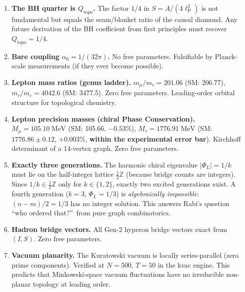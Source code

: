 \documentclass[11pt]{article}
\newcommand{\lP}{\ell_{\mathrm{P}}}
\begin{document}
\begin{enumerate}
\item \textbf{The BH quarter is $Q_{\mathrm{topo}}$.}
  The factor $1/4$ in $S = A/(4\lP^2)$ is not fundamental
  but equals the seam/blanket ratio of the causal diamond.
  Any future derivation of the BH coefficient from first
  principles must recover $Q_{\mathrm{topo}} = 1/4$.

\item \textbf{Bare coupling $\alpha_0 = 1/(32\pi)$.}
  No free parameters.  Falsifiable by Planck-scale
  measurements (if they ever become possible).

\item \textbf{Lepton mass ratios (genus ladder).}
  $m_\mu/m_e = 201.06$ (SM: 206.77),
  $m_\tau/m_e = 4042.6$ (SM: 3477.5).
  Zero free parameters.  Leading-order orbital structure
  for topological chemistry.

\item \textbf{Lepton precision masses (chiral Phase Conservation).}
  $M_\mu = 105.10\;\mathrm{MeV}$ (SM: 105.66, $-0.53\%$),
  $M_\tau = 1776.91\;\mathrm{MeV}$ (SM: $1776.86 \pm 0.12$,
  $+0.003\%$, \textbf{within the experimental error bar}).
  Kirchhoff determinant of a 14-vertex graph.
  Zero free parameters.

\item \textbf{Exactly three generations.}
  The harmonic chiral eigenvalue $|\Phi_L| = 1/k$ must lie
  on the half-integer lattice $\tfrac{1}{2}\mathbb{Z}$
  (because bridge counts are integers).  Since
  $1/k \in \tfrac{1}{2}\mathbb{Z}$ only for $k \in \{1,2\}$,
  exactly two excited generations exist.  A fourth generation
  ($k = 3$, $\Phi_L = 1/3$) is \emph{algebraically impossible}:
  $(n - m)/2 = 1/3$ has no integer solution.  This answers
  Rabi's question ``who ordered that?''\ from pure graph
  combinatorics.

\item \textbf{Hadron bridge vectors.}
  All Gen-2 hyperon bridge vectors exact from $(I, S)$.
  Zero free parameters.

\item \textbf{Vacuum planarity.}
  The Kuratowski vacuum is locally series-parallel (zero
  prime components).  Verified at $N = 500$, $T = 50$ in
  the kvac engine.  This predicts that Minkowski-space
  vacuum fluctuations have no irreducible non-planar
  topology at leading order.
\end{enumerate}
\end{document}
